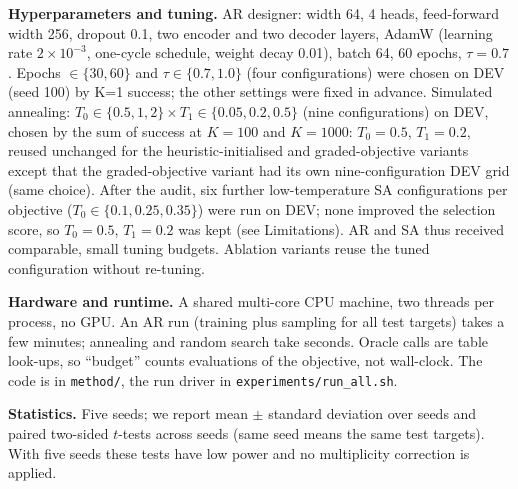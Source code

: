 \textbf{Hyperparameters and tuning.} AR designer: width 64, 4 heads, feed-forward width 256, dropout 0.1, two encoder and two decoder layers, AdamW (learning rate $2\times10^{-3}$, one-cycle schedule, weight decay 0.01), batch 64, 60 epochs, $\tau=0.7$. Epochs $\in\{30,60\}$ and $\tau\in\{0.7,1.0\}$ (four configurations) were chosen on DEV (seed 100) by K=1 success; the other settings were fixed in advance. Simulated annealing: $T_0\in\{0.5,1,2\}\times T_1\in\{0.05,0.2,0.5\}$ (nine configurations) on DEV, chosen by the sum of success at $K=100$ and $K=1000$: $T_0=0.5$, $T_1=0.2$, reused unchanged for the heuristic-initialised and graded-objective variants except that the graded-objective variant had its own nine-configuration DEV grid (same choice). After the audit, six further low-temperature SA configurations per objective ($T_0\in\{0.1,0.25,0.35\}$) were run on DEV; none improved the selection score, so $T_0=0.5$, $T_1=0.2$ was kept (see Limitations). AR and SA thus received comparable, small tuning budgets. Ablation variants reuse the tuned configuration without re-tuning.

\textbf{Hardware and runtime.} A shared multi-core CPU machine, two threads per process, no GPU. An AR run (training plus sampling for all test targets) takes a few minutes; annealing and random search take seconds. Oracle calls are table look-ups, so ``budget'' counts evaluations of the objective, not wall-clock. The code is in \texttt{method/}, the run driver in \texttt{experiments/run\_all.sh}.

\textbf{Statistics.} Five seeds; we report mean $\pm$ standard deviation over seeds and paired two-sided $t$-tests across seeds (same seed means the same test targets). With five seeds these tests have low power and no multiplicity correction is applied.

